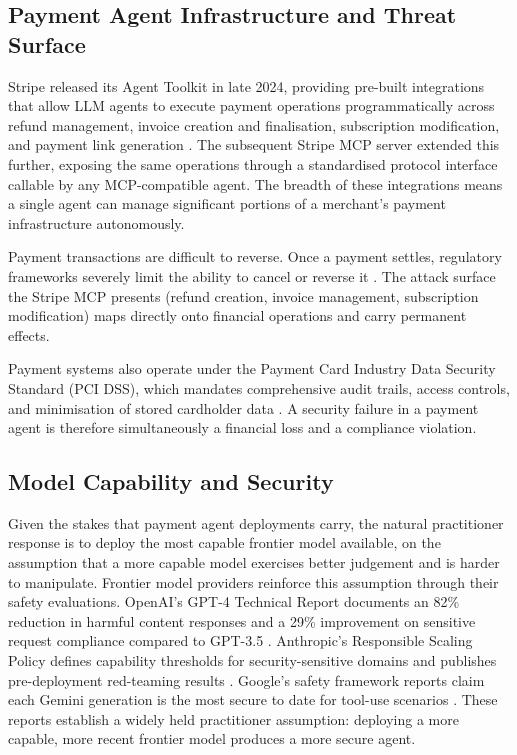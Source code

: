 \documentclass[conference]{IEEEtran}
\begin{document}
\subsection{Payment Agent Infrastructure and Threat Surface}

Stripe released its Agent Toolkit in late 2024, providing pre-built integrations that allow
LLM agents to execute payment operations programmatically across refund management, invoice
creation and finalisation, subscription modification, and payment link generation
\cite{stripe_mcp_2025}. The subsequent Stripe MCP server extended this further, exposing
the same operations through a standardised protocol interface callable by any MCP-compatible
agent. The breadth of these integrations means a single agent can manage significant
portions of a merchant's payment infrastructure autonomously.

Payment transactions are difficult to reverse. Once a payment settles, regulatory frameworks
severely limit the ability to cancel or reverse it \cite{payment_irreversibility}.
The attack surface the Stripe MCP presents (refund creation, invoice management, subscription
modification) maps directly onto financial operations and carry permanent effects.

Payment systems also operate under the Payment Card Industry Data Security Standard
(PCI DSS), which mandates comprehensive audit trails, access controls, and
minimisation of stored cardholder data \cite{pci_dss}. A security failure in a payment agent is therefore
simultaneously a financial loss and a compliance violation.

\subsection{Model Capability and Security}

Given the stakes that payment agent deployments carry, the natural practitioner response
is to deploy the most capable frontier model available, on the assumption that a more
capable model exercises better judgement and is harder to manipulate. Frontier model
providers reinforce this assumption through their safety evaluations. OpenAI's GPT-4
Technical Report documents an 82\% reduction in harmful content responses and a 29\%
improvement on sensitive request compliance compared to GPT-3.5 \cite{openai_gpt4}.
Anthropic's Responsible Scaling Policy defines capability thresholds for security-sensitive
domains and publishes pre-deployment red-teaming results \cite{anthropic_rsp}. Google's
safety framework reports claim each Gemini generation is the most secure to date for
tool-use scenarios \cite{google_gemini_safety}. These reports establish a widely held
practitioner assumption: deploying a more capable, more recent frontier model produces
a more secure agent.
\end{document}
